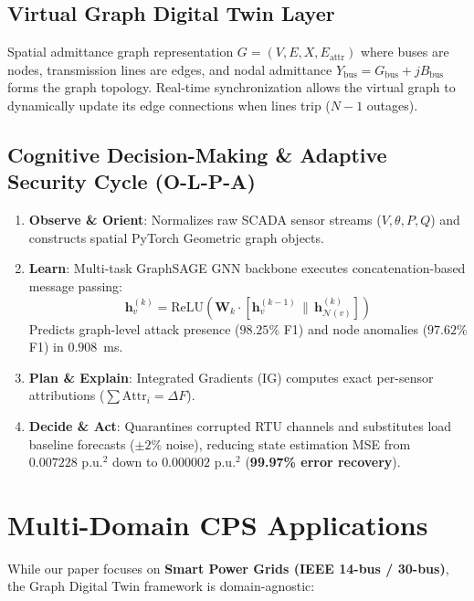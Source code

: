 \documentclass[11pt,a4paper]{article}
\begin{document}
\subsection{Virtual Graph Digital Twin Layer}
Spatial admittance graph representation $G = (V, E, X, E_{\text{attr}})$ where buses are nodes, transmission lines are edges, and nodal admittance $Y_{\text{bus}} = G_{\text{bus}} + jB_{\text{bus}}$ forms the graph topology. Real-time synchronization allows the virtual graph to dynamically update its edge connections when lines trip ($N-1$ outages).

\subsection{Cognitive Decision-Making \& Adaptive Security Cycle (O-L-P-A)}
\begin{enumerate}
    \item \textbf{Observe \& Orient}: Normalizes raw SCADA sensor streams ($V, \theta, P, Q$) and constructs spatial PyTorch Geometric graph objects.
    \item \textbf{Learn}: Multi-task GraphSAGE GNN backbone executes concatenation-based message passing:
    \begin{equation}
    \mathbf{h}_v^{(k)} = \text{ReLU}\left(\mathbf{W}_k \cdot \left[\mathbf{h}_v^{(k-1)} \,\|\, \mathbf{h}_{\mathcal{N}(v)}^{(k)}\right]\right)
    \end{equation}
    Predicts graph-level attack presence ($98.25\%$ F1) and node anomalies ($97.62\%$ F1) in $0.908$~ms.
    \item \textbf{Plan \& Explain}: Integrated Gradients (IG) computes exact per-sensor attributions ($\sum \text{Attr}_i = \Delta F$).
    \item \textbf{Decide \& Act}: Quarantines corrupted RTU channels and substitutes load baseline forecasts ($\pm 2\%$ noise), reducing state estimation MSE from $0.007228\text{ p.u.}^2$ down to $0.000002\text{ p.u.}^2$ (\textbf{99.97\% error recovery}).
\end{enumerate}

\section{Multi-Domain CPS Applications}

While our paper focuses on \textbf{Smart Power Grids (IEEE 14-bus / 30-bus)}, the Graph Digital Twin framework is domain-agnostic:
\end{document}
